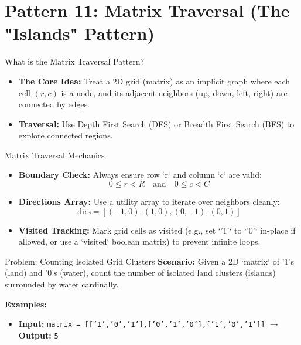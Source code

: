 \section{Pattern 11: Matrix Traversal (The "Islands" Pattern)}

\begin{frame}[c]{\empty}
    \begin{center}
        \Large\textbf{\secname}
    \end{center}
\end{frame}

\begin{frame}{What is the Matrix Traversal Pattern?}
  \begin{itemize}
    \item \textbf{The Core Idea:} Treat a 2D grid (matrix) as an implicit graph where each cell $(r, c)$ is a node, and its adjacent neighbors (up, down, left, right) are connected by edges.
    \item \textbf{Traversal:} Use Depth First Search (DFS) or Breadth First Search (BFS) to explore connected regions.
  \end{itemize}
\end{frame}

\begin{frame}{Matrix Traversal Mechanics}
  \begin{itemize}
    \item \textbf{Boundary Check:} Always ensure row `r` and column `c` are valid:
      $$0 \le r < R \quad \text{and} \quad 0 \le c < C$$
    \item \textbf{Directions Array:} Use a utility array to iterate over neighbors cleanly:
      $$\text{dirs} = [(-1, 0), (1, 0), (0, -1), (0, 1)]$$
    \item \textbf{Visited Tracking:} Mark grid cells as visited (e.g., set `'1'` to `'0'` in-place if allowed, or use a `visited` boolean matrix) to prevent infinite loops.
  \end{itemize}
\end{frame}

\begin{frame}[fragile]{Problem: Counting Isolated Grid Clusters}
  \textbf{Scenario:}
  Given a 2D `matrix` of '1's (land) and '0's (water), count the number of isolated land clusters (islands) surrounded by water cardinally.
  
  \vspace{0.3cm}
  \textbf{Examples:}
  \begin{itemize}
    \item \textbf{Input:} \texttt{matrix = [['1','0','1'],['0','1','0'],['1','0','1']]} $\rightarrow$ \textbf{Output:} \texttt{5}
  \end{itemize}
\end{frame}

